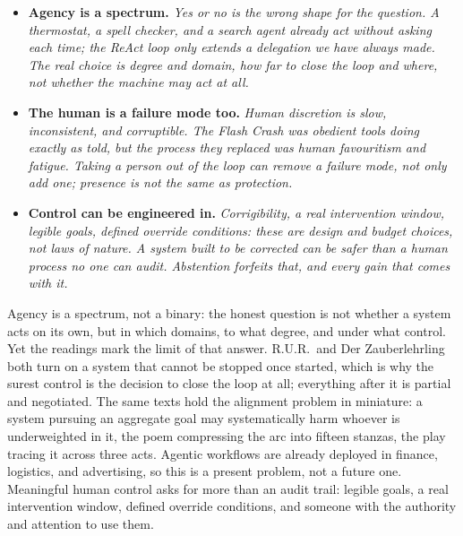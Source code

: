 \begin{itemize}
    \item \textbf{Agency is a spectrum.} \textit{Yes or no is the wrong shape for the
    question. A thermostat, a spell checker, and a search agent already act
    without asking each time; the ReAct loop only extends a delegation we have
    always made. The real choice is degree and domain, how far to close the
    loop and where, not whether the machine may act at all.}

    \item \textbf{The human is a failure mode too.} \textit{Human discretion is slow,
    inconsistent, and corruptible. The Flash Crash was obedient tools doing
    exactly as told, but the process they replaced was human favouritism and
    fatigue. Taking a person out of the loop can remove a failure mode, not
    only add one; presence is not the same as protection.}

    \item \textbf{Control can be engineered in.} \textit{Corrigibility, a real
    intervention window, legible goals, defined override conditions: these are
    design and budget choices, not laws of nature. A system built to be
    corrected can be safer than a human process no one can audit. Abstention
    forfeits that, and every gain that comes with it.}
\end{itemize}


Agency is a spectrum, not a binary: the honest question is not whether a system acts on its own,
but in which domains, to what degree, and under what control. Yet the readings mark the limit of
that answer. R.U.R.\ and Der Zauberlehrling both turn on a system that cannot be stopped once
started, which is why the surest control is the decision to close the loop at all; everything after
it is partial and negotiated. The same texts hold the alignment problem in miniature: a system
pursuing an aggregate goal may systematically harm whoever is underweighted in it, the poem
compressing the arc into fifteen stanzas, the play tracing it across three acts. Agentic workflows
are already deployed in finance, logistics, and advertising, so this is a present problem, not a
future one. Meaningful human control asks for more than an audit trail: legible goals, a real
intervention window, defined override conditions, and someone with the authority and attention to
use them.

